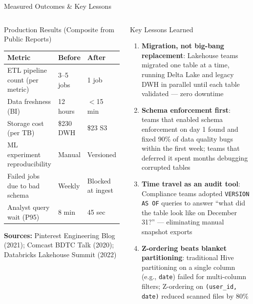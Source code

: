 \documentclass[aspectratio=169,10pt]{beamer}
\begin{document}
\begin{frame}{Measured Outcomes \& Key Lessons}
  \begin{columns}[T]
      \begin{block}{Production Results (Composite from Public Reports)}
        \renewcommand{\arraystretch}{1.25}
        \begin{tabular}{@{}p{4.0cm}p{1.8cm}p{1.8cm}@{}}
          \toprule
          \textbf{Metric} & \textbf{Before} & \textbf{After} \\
          \midrule
          ETL pipeline count (per metric) & 3--5 jobs & 1 job \\
          Data freshness (BI)             & 12 hours  & $<$15 min \\
          Storage cost (per TB)           & \$230 DWH & \$23 S3 \\
          ML experiment reproducibility   & Manual    & Versioned \\
          Failed jobs due to bad schema   & Weekly    & Blocked at ingest \\
          Analyst query wait (P95)        & 8 min     & 45 sec \\
          \bottomrule
        \end{tabular}
        \vspace{4pt}
        \small
        \textbf{Sources:} Pinterest Engineering Blog (2021);
        Comcast BDTC Talk (2020); Databricks Lakehouse Summit (2022)
      \end{block}

      \begin{block}{Key Lessons Learned}
        \begin{enumerate}
          \item \textbf{Migration, not big-bang replacement}:
                Lakehouse teams migrated one table at a time,
                running Delta Lake and legacy DWH in parallel
                until each table validated — zero downtime
          \item \textbf{Schema enforcement first}:
                teams that enabled schema enforcement on day 1
                found and fixed 90\% of data quality bugs within
                the first week; teams that deferred it spent
                months debugging corrupted tables
          \item \textbf{Time travel as an audit tool}:
                Compliance teams adopted \texttt{VERSION AS OF}
                queries to answer ``what did the table look like
                on December 31?'' — eliminating manual snapshot exports
          \item \textbf{Z-ordering beats blanket partitioning}:
                traditional Hive partitioning on a single column
                (e.g., \texttt{date}) failed for multi-column
                filters; Z-ordering on \texttt{(user\_id, date)}
                reduced scanned files by 80\%
        \end{enumerate}
      \end{block}
  \end{columns}
\end{frame}
\end{document}
